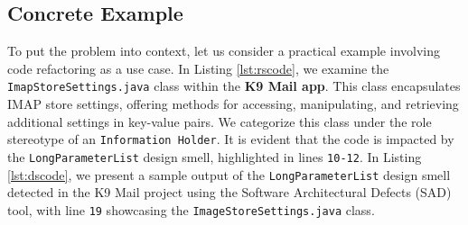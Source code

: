 \documentclass[AMA,Times1COL]{WileyNJDv5} %
\begin{document}
\subsection{Concrete Example}
%
To put the problem into context, let us consider a practical example involving code refactoring as a use case. In Listing \ref{lst:rscode}, we examine the {\tt ImapStoreSettings.java} class within the \textbf{K9 Mail app}. This class encapsulates IMAP store settings, offering methods for accessing, manipulating, and retrieving additional settings in key-value pairs. We categorize this class under the role stereotype of an {\tt Information Holder}. It is evident that the code is impacted by the {\tt LongParameterList} design smell, highlighted in lines {\tt 10-12}. In Listing \ref{lst:dscode}, we present a sample output of the {\tt LongParameterList} design smell detected in the K9 Mail project using the Software Architectural Defects (SAD) tool, with line {\tt 19} showcasing the {\tt ImageStoreSettings.java} class.
\end{document}
